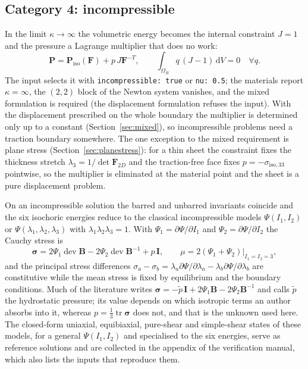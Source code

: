 \documentclass[11pt]{article}
\newcommand{\ud}{\,\mathrm{d}}
\newcommand{\dev}{\operatorname{dev}}
\newcommand{\tr}{\operatorname{tr}}
\newcommand{\bsig}{\bm{\sigma}}
\newcommand{\bP}{\bm{P}}
\newcommand{\bF}{\bm{F}}
\newcommand{\bB}{\bm{B}}
\newcommand{\bI}{\bm{I}}
\newcommand{\Ione}{I_1}
\newcommand{\Itwo}{I_2}
\DeclareRobustCommand{\code}[1]{{\def\_{\textunderscore\allowbreak}\texttt{#1}}}
\begin{document}
\subsection{Category 4: incompressible}
\label{sec:incompressible}

In the limit $\kappa \to \infty$ the volumetric energy becomes the
internal constraint $J = 1$ and the pressure a Lagrange multiplier that
does no work:
\begin{equation}
  \bP = \bP_{\mathrm{iso}}(\bF) + p\,J\bF^{-T}, \qquad
  \int_{\Omega_R} q\,(J - 1)\ud V = 0 \quad \forall q .
  \label{eq:incompressible}
\end{equation}
The input selects it with \code{incompressible: true} or \code{nu: 0.5};
the materials report $\kappa = \infty$, the $(2,2)$ block of the Newton
system vanishes, and the mixed formulation is required (the displacement
formulation refuses the input).  With the displacement prescribed on the
whole boundary the multiplier is determined only up to a constant
(Section~\ref{sec:mixed}), so incompressible problems need a traction
boundary somewhere.  The one exception to the mixed requirement is plane
stress (Section~\ref{sec:planestress}): for a thin sheet the constraint
fixes the thickness stretch $\lambda_3 = 1/\det\bF_{2D}$ and the
traction-free face fixes $p = -\sigma_{\mathrm{iso},33}$ pointwise, so the
multiplier is eliminated at the material point and the sheet is a pure
displacement problem.

On an incompressible solution the barred and unbarred invariants coincide
and the six isochoric energies reduce to the classical incompressible
models $\Psi(\Ione, \Itwo)$ or $\Psi(\lambda_1, \lambda_2, \lambda_3)$ with
$\lambda_1\lambda_2\lambda_3 = 1$.  With $\Psi_1 = \partial\Psi/\partial\Ione$
and $\Psi_2 = \partial\Psi/\partial\Itwo$ the Cauchy stress is
\begin{equation}
  \bsig = 2\Psi_1\dev\bB - 2\Psi_2\dev\bB^{-1} + p\,\bI,
  \qquad
  \mu = 2(\Psi_1 + \Psi_2)\big|_{\Ione = \Itwo = 3},
\end{equation}
and the principal stress differences
$\sigma_a - \sigma_b = \lambda_a\partial\Psi/\partial\lambda_a - \lambda_b\partial\Psi/\partial\lambda_b$
are constitutive while the mean stress is fixed by equilibrium and the
boundary conditions.  Much of the literature writes
$\bsig = -\tilde p\,\bI + 2\Psi_1\bB - 2\Psi_2\bB^{-1}$ and calls $\tilde p$
the hydrostatic pressure; its value depends on which isotropic terms an
author absorbs into it, whereas $p = \tfrac13\tr\bsig$ does not, and that is
the unknown used here.  The closed-form uniaxial, equibiaxial, pure-shear
and simple-shear states of these models, for a general $\Psi(\Ione, \Itwo)$
and specialised to the six energies, serve as reference solutions and are
collected in the appendix of the verification manual, which also lists the
inputs that reproduce them.
\end{document}
